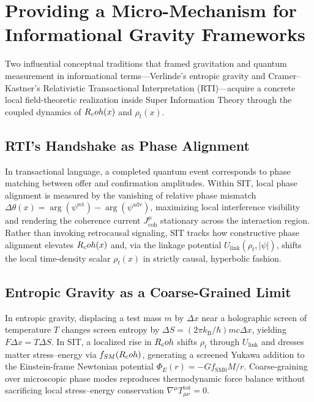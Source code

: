 \section{Providing a Micro-Mechanism for Informational Gravity Frameworks}
\label{sec:entropic_RTI_SIT}

Two influential conceptual traditions that framed gravitation and quantum measurement in informational terms---Verlinde's entropic gravity and Cramer--Kastner's Relativistic Transactional Interpretation (RTI)---acquire a concrete local field-theoretic realization inside Super Information Theory through the coupled dynamics of $R_coh(x)$ and $\rho_t(x)$.

\subsection*{RTI's Handshake as Phase Alignment}

In transactional language, a completed quantum event corresponds to phase matching between offer and confirmation amplitudes. Within SIT, local phase alignment is measured by the vanishing of relative phase mismatch $\Delta\theta(x) = \arg(\psi^{\mathrm{ret}}) - \arg(\psi^{\mathrm{adv}})$, maximizing local interference visibility and rendering the coherence current $J^\mu_{\mathrm{coh}}$ stationary across the interaction region. Rather than invoking retrocausal signaling, SIT tracks how constructive phase alignment elevates $R_coh(x)$ and, via the linkage potential $U_{\mathrm{link}}(\rho_t, |\psi|)$, shifts the local time-density scalar $\rho_t(x)$ in strictly causal, hyperbolic fashion.

\subsection*{Entropic Gravity as a Coarse-Grained Limit}

In entropic gravity, displacing a test mass $m$ by $\Delta x$ near a holographic screen of temperature $T$ changes screen entropy by $\Delta S = (2\pi k_{\mathrm{B}}/\hbar) m c \Delta x$, yielding $F\Delta x = T\Delta S$. In SIT, a localized rise in $R_coh$ shifts $\rho_t$ through $U_{\mathrm{link}}$ and dresses matter stress--energy via $f_{SM}(R_coh)$, generating a screened Yukawa addition to the Einstein-frame Newtonian potential $\Phi_E(r) = -G f_{\mathrm{SM}0} M / r$. Coarse-graining over microscopic phase modes reproduces thermodynamic force balance without sacrificing local stress--energy conservation $\nabla^\mu T^{\mathrm{tot}}_{\mu\nu} = 0$.

